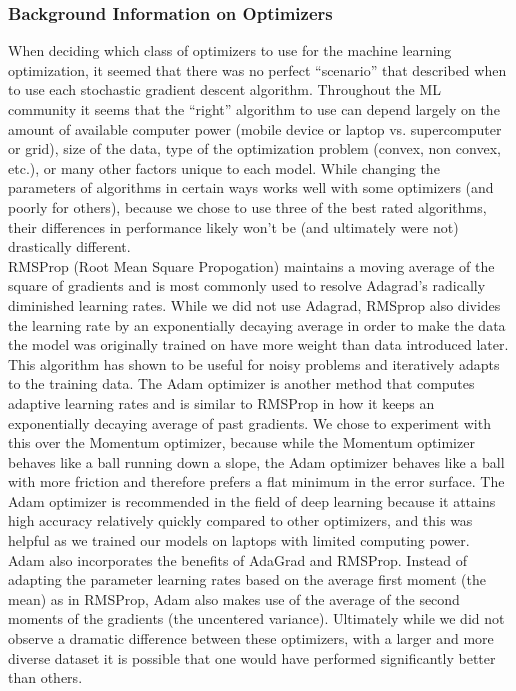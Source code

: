 \documentclass[11pt,a4paper]{article}
\newcommand\tab[1][1cm]{\hspace*{#1}}
\begin{document}
\subsubsection*{Background Information on Optimizers}
\tab When deciding which class of optimizers to use for the machine learning optimization, it seemed that there was no perfect “scenario” that described when to use each stochastic gradient descent algorithm. Throughout the ML community it seems that the “right” algorithm to use can depend largely on the amount of available computer power (mobile device or laptop vs. supercomputer or grid), size of the data, type of the optimization problem (convex, non convex, etc.), or many other factors unique to each model. While changing the parameters of algorithms in certain ways works well with some optimizers (and poorly for others), because we chose to use three of the best rated algorithms, their differences in performance likely won't be (and ultimately were not) drastically different.\\
\tab RMSProp (Root Mean Square Propogation) maintains a moving average of the square of gradients and is most commonly used to resolve Adagrad’s radically diminished learning rates. While we did not use Adagrad, RMSprop also divides the learning rate by an exponentially decaying average in order to make the data the model was originally trained on have more weight than data introduced later. This algorithm has shown to be useful for noisy problems and iteratively adapts to the training data. The Adam optimizer is another method that computes adaptive learning rates and is similar to RMSProp in how it keeps an exponentially decaying average of past gradients. We chose to experiment with this over the Momentum optimizer, because while the Momentum optimizer behaves like a ball running down a slope, the Adam optimizer behaves like a ball with more friction and therefore prefers a flat minimum in the error surface. The Adam optimizer is recommended in the field of deep learning because it attains high accuracy relatively quickly compared to other optimizers, and this was helpful as we trained our models on laptops with limited computing power. \\ \tab Adam also incorporates the benefits of AdaGrad and RMSProp. Instead of adapting the parameter learning rates based on the average first moment (the mean) as in RMSProp, Adam also makes use of the average of the second moments of the gradients (the uncentered variance). Ultimately while we did not observe a dramatic difference between these optimizers, with a larger and more diverse dataset it is possible that one would have performed significantly better than others.
\end{document}
